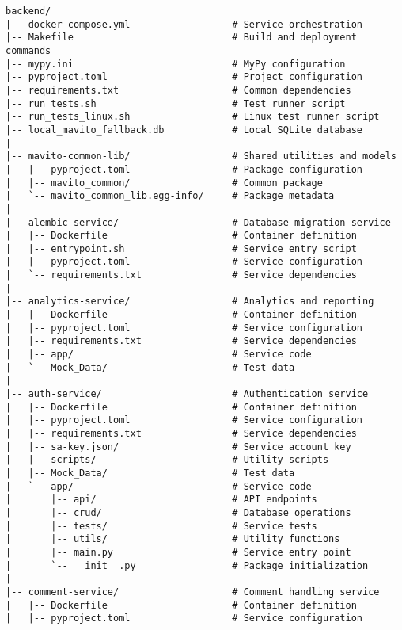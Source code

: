 \documentclass[12pt]{article}
\begin{document}
\begin{lstlisting}[frame=single, numbers=none, basicstyle=\ttfamily\footnotesize, columns=flexible]
backend/
|-- docker-compose.yml                  # Service orchestration
|-- Makefile                            # Build and deployment commands
|-- mypy.ini                            # MyPy configuration
|-- pyproject.toml                      # Project configuration
|-- requirements.txt                    # Common dependencies
|-- run_tests.sh                        # Test runner script
|-- run_tests_linux.sh                  # Linux test runner script
|-- local_mavito_fallback.db            # Local SQLite database
|
|-- mavito-common-lib/                  # Shared utilities and models
|   |-- pyproject.toml                  # Package configuration
|   |-- mavito_common/                  # Common package
|   `-- mavito_common_lib.egg-info/     # Package metadata
|
|-- alembic-service/                    # Database migration service
|   |-- Dockerfile                      # Container definition
|   |-- entrypoint.sh                   # Service entry script
|   |-- pyproject.toml                  # Service configuration
|   `-- requirements.txt                # Service dependencies
|
|-- analytics-service/                  # Analytics and reporting
|   |-- Dockerfile                      # Container definition
|   |-- pyproject.toml                  # Service configuration
|   |-- requirements.txt                # Service dependencies
|   |-- app/                            # Service code
|   `-- Mock_Data/                      # Test data
|
|-- auth-service/                       # Authentication service
|   |-- Dockerfile                      # Container definition
|   |-- pyproject.toml                  # Service configuration
|   |-- requirements.txt                # Service dependencies
|   |-- sa-key.json/                    # Service account key
|   |-- scripts/                        # Utility scripts
|   |-- Mock_Data/                      # Test data
|   `-- app/                            # Service code
|       |-- api/                        # API endpoints
|       |-- crud/                       # Database operations
|       |-- tests/                      # Service tests
|       |-- utils/                      # Utility functions
|       |-- main.py                     # Service entry point
|       `-- __init__.py                 # Package initialization
|
|-- comment-service/                    # Comment handling service
|   |-- Dockerfile                      # Container definition
|   |-- pyproject.toml                  # Service configuration

\end{lstlisting}
\end{document}
